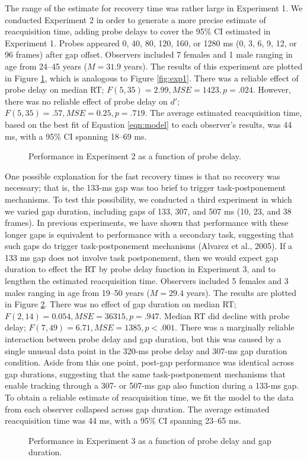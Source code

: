 \documentclass[jou,nobf]{apa}
\newcommand{\MSE}{\ensuremath{\mathit{MSE}}}
\begin{document}
The range of the estimate for recovery time was rather large in Experiment
1.  We conducted Experiment 2 in order to generate a more precise estimate
of reacquisition time, adding probe delays to cover the 95\% CI estimated
in Experiment 1.  Probes appeared 0, 40, 80, 120, 160, or 1280 ms (0, 3, 6,
9, 12, or 96 frames) after gap offset.  Observers included 7 females and 1
male ranging in age from 24--45 years ($M = 31.9$ years).  The results of
this experiment are plotted in Figure \ref{fig:exp2}, which is analogous to
Figure \ref{fig:exp1}.  There was a reliable effect of probe delay on
median RT; $F(5, 35) = 2.99, \MSE = 1423, p = .024$.  However, there was no
reliable effect of probe delay on $d'$; $F(5, 35) = .57, \MSE = 0.25, p =
.719$.  The average estimated reacquisition time, based on the best fit of
Equation \ref{eqn:model} to each observer's results, was 44 ms, with a 95\%
CI spanning 18--69 ms.
\begin{figure}
  \centering
  \caption{Performance in Experiment 2 as a function of probe delay.}
  \label{fig:exp2}
\end{figure}

One possible explanation for the fast recovery times is that no recovery
was necessary; that is, the 133-ms gap was too brief to trigger
task-postponement mechanisms.  To test this possibility, we conducted a
third experiment in which we varied gap duration, including gaps of 133,
307, and 507 ms (10, 23, and 38 frames). In previous experiments, we have
shown that performance with these longer gaps is equivalent to performance
with a secondary task, suggesting that such gaps do trigger
task-postponement mechanisms (Alvarez et al., 2005).  If a 133 ms gap does
not involve task postponement, then we would expect gap duration to effect
the RT by probe delay function in Experiment 3, and to lengthen the
estimated reacquisition time.  Observers included 5 females and 3 males
ranging in age from 19--50 years ($M = 29.4$ years). The results are
plotted in Figure \ref{fig:exp3}.  There was no effect of gap duration on
median RT; $F(2, 14) = 0.054, \MSE = 36315, p = .947$.  Median RT did
decline with probe delay; $F(7, 49) = 6.71, \MSE = 1385, p < .001$.  There
was a marginally reliable interaction between probe delay and gap duration,
but this was caused by a single unusual data point in the 320-ms probe
delay and 307-ms gap duration condition.  Aside from this one point,
post-gap performance was identical across gap durations, suggesting that
the same task-postponement mechanisms that enable tracking through a 307-
or 507-ms gap also function during a 133-ms gap.  To obtain a reliable
estimate of reacquisition time, we fit the model to the data from each
observer collapsed across gap duration.  The average estimated
reacquisition time was 44 ms, with a 95\% CI spanning 23--65 ms.
\begin{figure}
  \centering
  \caption{Performance in Experiment 3 as a function of probe delay and gap
    duration.}
  \label{fig:exp3}
\end{figure}
\end{document}
